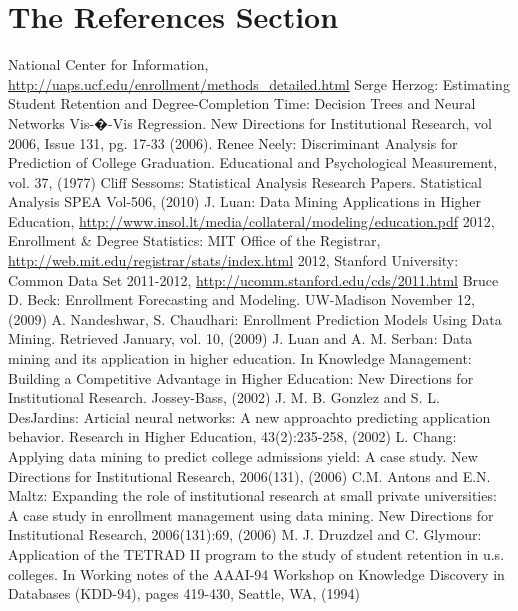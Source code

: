 \documentclass[runningheads,a4paper]{llncs}
\begin{document}
\mainmatter  %

\section{The References Section}\label{references}

\begin{thebibliography}{10}

 National Center for Information, \url{http://uaps.ucf.edu/enrollment/methods_detailed.html}
 Serge Herzog: Estimating Student Retention and Degree-Completion Time: Decision Trees and Neural Networks Vis-�-Vis Regression. New Directions for Institutional Research, vol 2006, Issue 131, pg. 17-33 (2006).
 Renee Neely: Discriminant Analysis for Prediction of College Graduation. Educational and Psychological Measurement, vol. 37, (1977)
 Cliff Sessoms: Statistical Analysis Research Papers. Statistical Analysis SPEA Vol-506, (2010)
 J. Luan: Data Mining Applications in Higher Education, \url{http://www.insol.lt/media/collateral/modeling/education.pdf}
 2012, Enrollment \& Degree Statistics: MIT Office of the Registrar, \url{http://web.mit.edu/registrar/stats/index.html}
 2012, Stanford University: Common Data Set 2011-2012, \url{ http://ucomm.stanford.edu/cds/2011.html}
 Bruce D. Beck: Enrollment Forecasting and Modeling. UW-Madison November 12, (2009)
 A. Nandeshwar, S. Chaudhari: Enrollment Prediction Models Using Data Mining. Retrieved January, vol. 10, (2009)
 J. Luan and A. M. Serban: Data mining and its application in higher education. In Knowledge Management: Building a Competitive Advantage in Higher Education: New Directions for Institutional Research. Jossey-Bass, (2002)
 J. M. B. Gonzlez and S. L. DesJardins: Articial neural networks: A new approachto predicting application behavior. Research in Higher Education, 43(2):235-258, (2002)
 L. Chang: Applying data mining to predict college admissions yield: A case study. New Directions for Institutional Research, 2006(131), (2006)
 C.M. Antons and E.N. Maltz: Expanding the role of institutional research at small private universities: A case study in enrollment management using data mining. New Directions for Institutional Research, 2006(131):69, (2006)
 M. J. Druzdzel and C. Glymour: Application of the TETRAD II program to the study of student retention in u.s. colleges. In Working notes of the AAAI-94 Workshop on Knowledge Discovery in Databases (KDD-94), pages 419-430, Seattle, WA, (1994)

\end{thebibliography}
\end{document}
